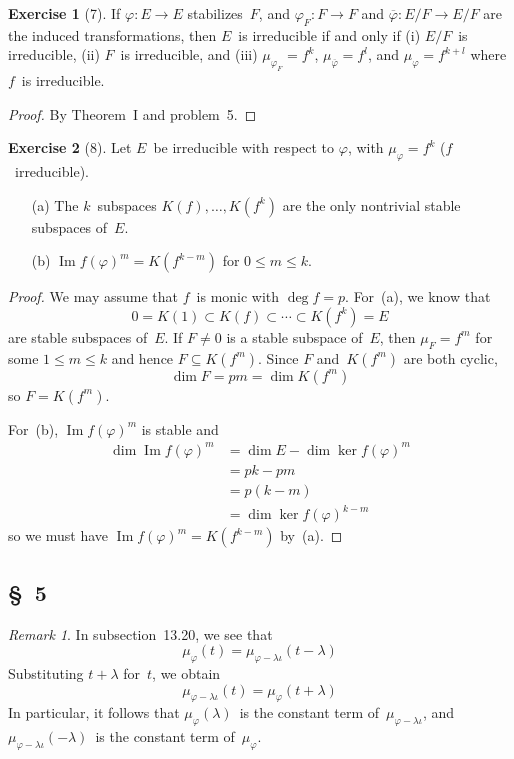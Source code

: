 \documentclass[letterpaper,12pt]{article}
\DeclareMathOperator{\im}{Im}
\newcommand{\proj}[1]{\overline{#1}}
\theoremstyle{definition}
\newtheorem*{exer}{Exercise}
\theoremstyle{remark}
\newtheorem*{rmk}{Remark}
\begin{document}
\begin{exer}[7]
If \(\varphi:E\to E\) stabilizes~\(F\), and \(\varphi_F:F\to F\) and \(\proj{\varphi}:E/F\to E/F\) are the induced transformations, then \(E\)~is irreducible if and only if (i) \(E/F\)~is irreducible, (ii) \(F\)~is irreducible, and (iii) \(\mu_{\varphi_F}=f^k\), \(\mu_{\proj{\varphi}}=f^l\), and \(\mu_{\varphi}=f^{k+l}\) where \(f\)~is irreducible.
\end{exer}
\begin{proof}
By Theorem~I and problem~5.
\end{proof}

\begin{exer}[8]
Let \(E\)~be irreducible with respect to \(\varphi\), with \(\mu_{\varphi}=f^k\) (\(f\)~irreducible).
\begin{enumerate}
\item[(a)] The \(k\)~subspaces \(K(f),\ldots,K(f^k)\) are the only nontrivial stable subspaces of~\(E\).
\item[(b)] \(\im f(\varphi)^m=K(f^{k-m})\) for \(0\le m\le k\).
\end{enumerate}
\end{exer}
\begin{proof}
We may assume that \(f\)~is monic with \(\deg f=p\). For~(a), we know that
\[0=K(1)\subset K(f)\subset\cdots\subset K(f^k)=E\]
are stable subspaces of~\(E\). If \(F\ne 0\) is a stable subspace of~\(E\), then \(\mu_F=f^m\) for some \(1\le m\le k\) and hence \(F\subseteq K(f^m)\). Since \(F\) and~\(K(f^m)\) are both cyclic,
\[\dim F=pm=\dim K(f^m)\]
so \(F=K(f^m)\).

For~(b), \(\im f(\varphi)^m\) is stable and
\begin{align*}
\dim\im f(\varphi)^m&=\dim E-\dim\ker f(\varphi)^m\\
	&=pk-pm\\
	&=p(k-m)\\
	&=\dim\ker f(\varphi)^{k-m}
\end{align*}
so we must have \(\im f(\varphi)^m=K(f^{k-m})\) by~(a).
\end{proof}

\subsection*{\S~5}
\begin{rmk}
In subsection~13.20, we see that
\[\mu_{\varphi}(t)=\mu_{\varphi-\lambda\iota}(t-\lambda)\]
Substituting \(t+\lambda\) for~\(t\), we obtain
\[\mu_{\varphi-\lambda\iota}(t)=\mu_{\varphi}(t+\lambda)\]
In particular, it follows that \(\mu_{\varphi}(\lambda)\)~is the constant term of~\(\mu_{\varphi-\lambda\iota}\), and \(\mu_{\varphi-\lambda\iota}(-\lambda)\)~is the constant term of~\(\mu_{\varphi}\).
\end{rmk}
\end{document}
